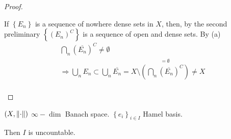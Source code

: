 \begin{proof}
\begin{itemize}
        If \(\left\{ E_n \right\}\) is a sequence of nowhere dense sets in \(X\), then, by the second preliminary \(\left\{ (E_n)^C \right\}\) is a sequence of open and dense sets. By (a) 
        \[
            \begin{array}{l}
                \bigcap_n (\overline{E_n})^C \neq \emptyset \\
                \Rightarrow \bigcup_n E_n \subset \bigcup_n \overline{E_n} = X \setminus \overset{= \emptyset}{\left(\bigcap_n (\overline{E_n})^C\right)} \neq X \\

            \end{array} 
        \]
    \end{itemize}
\end{proof}
\begin{example}
    \((X, \norm{\cdot})\) \(\infty-\dim\) Banach space. \(\left\{ e_i \right\}_{i \in I}\) Hamel basis. 
    
    Then \(I\) is uncountable.
\end{example}

